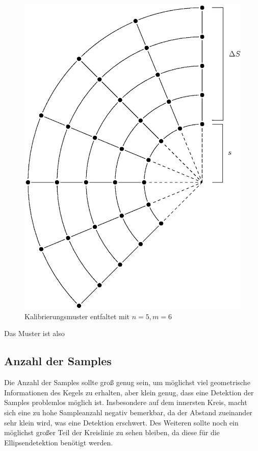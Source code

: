 \begin{figure}[!htb]
	\centering
	\includegraphics[scale=.7]{images/calibrationPattern2.eps}
	\caption{Kalibrierungsmuster entfaltet mit $n = 5, m = 6$}
	\label{fig:calibrationPattern}
\end{figure}

Das Muster ist also 

\subsection{Anzahl der Samples}
Die Anzahl der Samples sollte groß genug sein, um möglichst viel geometrische Informationen des Kegels zu erhalten, aber klein genug, dass eine Detektion der Samples problemlos möglich ist. Insbesondere auf dem innersten Kreis, macht sich eine zu hohe Sampleanzahl negativ bemerkbar, da der Abstand zueinander sehr klein wird, was eine Detektion erschwert. Des Weiteren sollte noch ein möglichst großer Teil der Kreislinie zu sehen bleiben, da diese für die Ellipsendetektion benötigt werden. 



